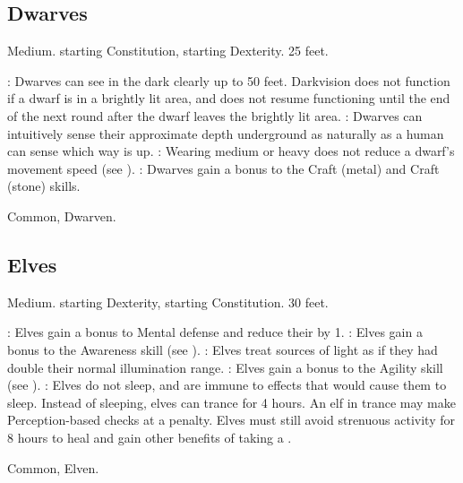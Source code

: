 \subsection{Dwarves}
 Medium.
  starting Constitution,  starting Dexterity.
 25 feet.
\begin{itemize}
    : Dwarves can see in the dark clearly up to 50 feet. Darkvision does not function if a dwarf is in a brightly lit area, and does not resume functioning until the end of the next round after the dwarf leaves the brightly lit area.
    : Dwarves can intuitively sense their approximate depth underground as naturally as a human can sense which way is up.
    : Wearing medium or heavy  does not reduce a dwarf's movement speed (see ).
    : Dwarves gain a  bonus to the Craft (metal) and Craft (stone) skills.
\end{itemize}
 Common, Dwarven.

\subsection{Elves}
 Medium.
  starting Dexterity,  starting Constitution.
 30 feet.
\begin{itemize}
    : Elves gain a  bonus to Mental defense and reduce their  by 1.
    : Elves gain a  bonus to the Awareness skill (see ).
    : Elves treat sources of light as if they had double their normal illumination range.
    : Elves gain a  bonus to the Agility skill (see ).
    : Elves do not sleep, and are immune to  effects that would cause them to sleep.
        Instead of sleeping, elves can trance for 4 hours.
        An elf in trance may make Perception-based checks at a  penalty.
        Elves must still avoid strenuous activity for 8 hours to heal and gain other benefits of taking a .
\end{itemize}
 Common, Elven.

